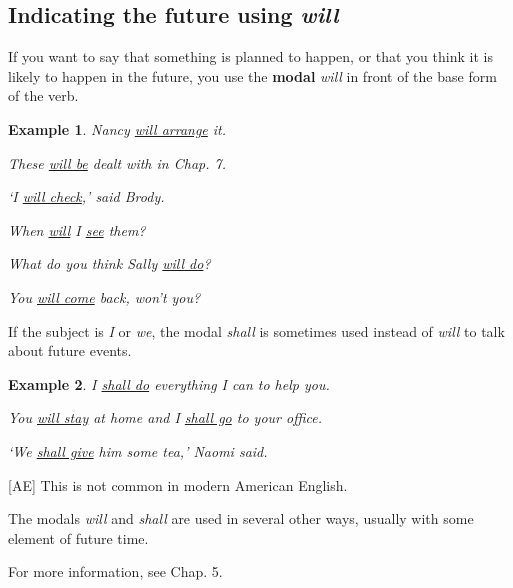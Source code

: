 \documentclass[oneside]{book}
\numberwithin{equation}{section}
\newtheorem{example}{Example}[section]
\begin{document}
\subsection{Indicating the future using \textit{will}}
\noindent{} If you want to say that something is planned to happen, or that you think it is likely to happen in the future, you use the \textbf{modal} \textit{will} in front of the base form of the verb.
\begin{example}
    Nancy \underline{will arrange} it.
    
    These \underline{will be} dealt with in Chap. 7.
    
    `I \underline{will check},' said Brody.
    
    When \underline{will} I \underline{see} them?
    
    What do you think Sally \underline{will do}?
    
    You \underline{will come} back, won't you?
\end{example}
If the subject is \textit{I} or \textit{we}, the modal \textit{shall} is sometimes used instead of \textit{will} to talk about future events.
\begin{example}
    I \underline{shall do} everything I can to help you.
    
    You \underline{will stay} at home and I \underline{shall go} to your office.
    
    `We \underline{shall give} him some tea,' Naomi said.
\end{example}
%
[AE] This is not common in modern American English.

%
The modals \textit{will} and \textit{shall} are used in several other ways, usually with some element of future time.

For more information, see Chap. 5.
\end{document}
